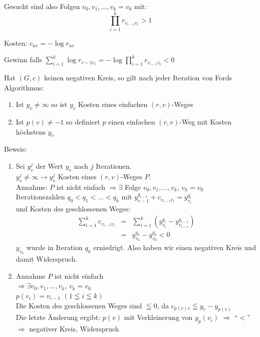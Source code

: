 Gesucht sind also Folgen $v_{0}, v_{1}, \ldots, v_{k} = v_{0}$ mit:
\[\prod^{k}_{i=1} r_{v_{i-1} v_{i}} > 1\] 

Kosten: $c_{u v} = -\log r_{u v}$

Gewinn falls $\sum_{i=1}^{k} \log r_{v-1v_{i}} = - \log \prod_{i=1}^{k}
r_{v_{i-1}v_{i}} < 0$

\begin{lemma} \label{Ford1}
Hat $(G,c)$ keinen negativen Kreis, so gilt nach jeder Iteration von Fords
Algorithmus:
\begin{enumerate}
\item Ist $y_{v} \not= \infty$ so ist $y_{v}$ Kosten eines einfachen 
$(r,v)$-Weges 
\item Ist $p(v) \not = -1$ so definiert $p$ einen einfachen $(r,v)$-Weg mit
Kosten höchstens $y_{v}$ 
\end{enumerate}
\end{lemma}

Beweis: 
\begin{enumerate}
\item Sei $y_{v}^{j}$ der Wert $y_{v}$ nach $j$ Iterationen.\\
$y_{v}^{j}\not= \infty \rightarrow  y_{v}^{j}$ Kosten eines
$(r,v)$-Weges $P$.\\
Annahme: $P$ ist nicht einfach $\Rightarrow \exists$ Folge $v_{0}, v_{1},
\ldots, v_{k}$,  $v_{k}= v_{0}$\\
Iterationszahlen $q_{0} < q_{1} < \ldots < q_{k}$ mit $y_{v-1}^{q_{i-1}} +
c_{v_{i-1}v_{i}} = y_{v_{i}}^{q_{i}}$\\
und Kosten des geschlossenen Weges:
\[\begin{array}{rcl}
\displaystyle \sum_{i=1}^{k} c_{v_{i-1}v_{i}} &=& \displaystyle \sum_{i=1}^{k} 
(y_{v_{i}}^{q_{i}} - y_{v_{i-1}}^{q_{i-1}})\\
&=& y_{v_{k}}^{q_{k}} - y_{v_{0}}^{q_{0}} < 0
\end{array}\]
$y_{v_{k}}$ wurde in Iteration $q_{k}$ erniedrigt. Also haben wir einen
negativen Kreis und damit Widerspruch. 
\item Annahme $P$ ist nicht einfach\\
$\Rightarrow \exists v_{0}, v_{1}, \ldots , v_{k}$, $v_{k}= v_{0}$\\
$p(v_{i})=v_{i-1}$  \hspace{3mm} $(1\leqq i \leqq k)$\\
Die Kosten des geschlossenen Weges sind $\leqq 0$, da $c_{p(v)v}  \leqq
y_{v} - y_{p(v)}$\\
Die letzte Änderung ergibt: $p(v)$ mit Verkleinerung von $y_{p}(v_{i})$
$\Rightarrow$ "`$<$"'\\
$\Rightarrow$ negativer Kreis, Widerspruch  
\end{enumerate}

